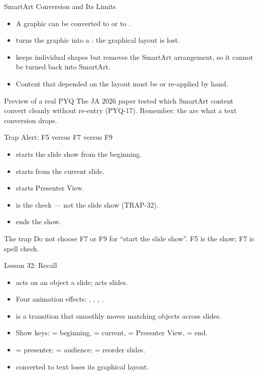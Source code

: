 \documentclass[aspectratio=169]{beamer}
\begin{document}
\begin{frame}{SmartArt Conversion and Its Limits}
  \begin{itemize}
    \item A  graphic can be converted to  or to
      .
    \item {} turns the graphic into a : the graphical layout is lost.
    \item {} keeps individual shapes but removes the
      SmartArt arrangement, so it cannot be turned back into SmartArt.
    \item Content that depended on the layout must be  or
      re-applied by hand.
  \end{itemize}
  \begin{block}{Preview of a real PYQ}
    The JA 2026 paper tested which SmartArt content  convert
    cleanly without re-entry \textnormal{(PYQ-17)}. Remember: the  are what a text conversion drops.
  \end{block}
\end{frame}

\begin{frame}{Trap Alert: F5 versus F7 versus F9}
  \begin{itemize}
    \item {} starts the slide show from the beginning.
    \item {} starts from the current slide.
    \item {} starts Presenter View.
    \item {} is the  check --- not the slide
      show (TRAP-32).
    \item {} ends the show.
  \end{itemize}
  \begin{alertblock}{The trap}
    Do not choose F7 or F9 for ``start the slide show''. F5 is the show;
    F7 is spell check.
  \end{alertblock}
\end{frame}

\begin{frame}{Lesson 32: Recall}
  \begin{itemize}
    \item {} acts on an object  a slide;
       acts  slides.
    \item Four animation effects: , ,
      , .
    \item {} is a transition that smoothly moves matching objects
      across slides.
    \item Show keys:  = beginning,  = current,
       = Presenter View,  = end.
    \item {} = presenter;  = audience;
       = reorder slides.
    \item {} converted to text loses its graphical layout.
  \end{itemize}
\end{frame}
\end{document}
